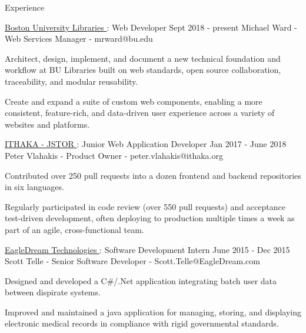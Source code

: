 \documentclass{resume} %
\begin{document}
  \begin{rSection}{Experience}

    \begin{rSubsection}{\underline{Boston University Libraries }: Web Developer }{ Sept 2018 - present }{ Michael Ward - Web Services Manager - mrward@bu.edu }

      \item Architect, design, implement, and document a new technical foundation and workflow at BU Libraries built on web standards, open source collaboration, traceability, and modular reusability.

      \item Create and expand a suite of custom web components, enabling a more consistent, feature-rich, and data-driven user experience across a variety of websites and platforms.

    \end{rSubsection}

    \begin{rSubsection}{\underline{ITHAKA - JSTOR }: Junior Web Application Developer }{ Jan 2017 - June 2018 }{ Peter Vlahakis - Product Owner - peter.vlahakis@ithaka.org }

      \item Contributed over 250 pull requests into a dozen frontend and backend repositories in six languages.

      \item Regularly participated in code review (over 550 pull requests) and acceptance test-driven development, often deploying to production multiple times a week as part of an agile, cross-functional team.

    \end{rSubsection}

    \begin{rSubsection}{\underline{EagleDream Technologies }: Software Development Intern }{ June 2015 - Dec 2015 }{ Scott Telle - Senior Software Developer - Scott.Telle@EagleDream.com }

      \item Designed and developed a C\#/.Net application integrating batch user data between dispirate systems.

      \item Improved and maintained a java application for managing, storing, and displaying electronic medical records in compliance with rigid governmental standards.

    \end{rSubsection}

  \end{rSection}
\end{document}
